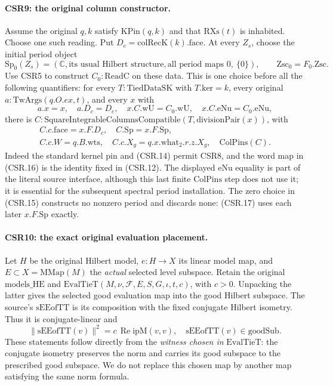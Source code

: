 \paragraph{CSR9: the original column constructor.}
\label{claim:CSR9}
Assume the original \(q,k\) satisfy \(\mathrm{KPin}(q,k)\)
and that \(\mathrm{RXs}(t)\) is inhabited. Choose one such reading.
Put \(D_c=\mathrm{colRecK}(k).\mathrm{face}\).
At every \(Z_s\), choose the initial period object
\[
       \mathrm{Sp}_0(Z_s)
           =(\mathbb C,\text{its usual Hilbert structure},
                         \text{all period maps }0,\ \{0\}),
       \qquad \mathrm{Zsc}_0=F_0.\mathrm{Zsc}.
 \tag{CSR.15}
\]
Use CSR5 to construct \(C_0:\mathrm{ReadC}\) on these data.
This is one choice before all the following quantifiers:
for every \(T:\mathrm{TiedDataSK}\) with \(T.\mathrm{ker}=k\),
every original \(a:\mathrm{TwArgs}(q.O.ex,t)\), and every \(x\)
with
\[
 a.x=x,\quad a.D_c=D_c,\quad
 x.C.\mathrm{wU}=C_0.\mathrm{wU},\quad
 x.C.\mathrm{eNu}=C_0.\mathrm{eNu},
 \tag{CSR.16}
\]
there is
\(C:\mathrm{SquareIntegrableColumnsCompatible}
(T,\mathrm{divisionPair}(x))\), with
\[
 \begin{gathered}
 C.c.\mathrm{face}=x.F.D_c,\quad C.\mathrm{Sp}=x.F.\mathrm{Sp},\\
 C.c.W=q.B.\mathrm{wts},\quad
 C.c.X_g=q.x.\mathrm{what}_2.r.z.X_g,\quad \mathrm{ColPins}(C).
 \end{gathered}
 \tag{CSR.17}
\]
Indeed the standard kernel pin and (CSR.14) permit CSR8, and
the word map in (CSR.16) is the identity fixed in (CSR.12).
The displayed \(\mathrm{eNu}\) equality is part of the literal
source interface, although this last finite \(\mathrm{ColPins}\)
step does not use it; it is essential for the subsequent spectral
period installation. The zero choice in (CSR.15) constructs no
nonzero period and discards none: (CSR.17) uses each later
\(x.F.\mathrm{Sp}\) exactly.

\paragraph{CSR10: the exact original evaluation placement.}
\label{claim:CSR10}
Let \(H\) be the original Hilbert model, \(e:H\to X\) its
linear model map, and \(E\subset X=\mathrm{MMap}(M)\) the
\emph{actual} selected level subspace. Retain the original
\(\mathrm{models\_HE}\) and \(\mathrm{EvalTieT}(M,\nu,\mathcal F,
E,S,G,\iota,t,c)\), with \(c>0\).
Unpacking the latter gives the selected good evaluation map into
the good Hilbert subspace. The source's
\(\mathrm{sEEofTT}\) is its composition with the fixed conjugate
Hilbert isometry. Thus it is conjugate-linear and
\[
 \|\mathrm{sEEofTT}(v)\|^2=c\,\operatorname{Re}\mathrm{ipM}(v,v),
 \quad
 \mathrm{sEEofTT}(v)\in\mathrm{goodSub}.
 \tag{CSR.18}
\]
These statements follow directly from the \emph{witness chosen in}
\(\mathrm{EvalTieT}\): the conjugate isometry preserves the norm
and carries its good subspace to the prescribed good subspace.
We do not replace this chosen map by another map satisfying the
same norm formula.

